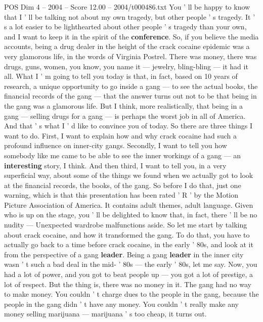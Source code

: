\begin{textsample}{POS Dim 4 – 2004 – Score 12.00 – 2004/t000486.txt}  \label{ex:f4_pos_059}
You ' ll be happy to know that I ' ll be talking not about my own tragedy, but other people ' s tragedy.
It ' s a lot easier to be lighthearted about other people ' s tragedy than your own, and I want to keep it in the spirit of the \textbf{conference}.
So, if you believe the media accounts, being a drug dealer in the height of the crack cocaine epidemic was a very glamorous life, in the words of Virginia Postrel.
There was money, there was drugs, guns, women, you know, you name it — jewelry, bling-bling — it had it all.
What I ' m going to tell you today is that, in fact, based on 10 years of research, a unique opportunity to go inside a gang — to see the actual books, the financial records of the gang — that the answer turns out not to be that being in the gang was a glamorous life.
But I think, more realistically, that being in a gang — selling drugs for a gang — is perhaps the worst job in all of America.
And that ' s what I ' d like to convince you of today.
So there are three things I want to do.
First, I want to explain how and why crack cocaine had such a profound influence on inner-city gangs.
Secondly, I want to tell you how somebody like me came to be able to see the inner workings of a gang — an \textbf{interesting} story, I think.
And then third, I want to tell you, in a very superficial way, about some of the things we found when we actually got to look at the financial records, the books, of the gang.
So before I do that, just one warning, which is that this presentation has been rated ' R ' by the Motion Picture Association of America.
It contains adult themes, adult language.
Given who is up on the stage, you ' ll be delighted to know that, in fact, there ' ll be no nudity — Unexpected wardrobe malfunctions aside.
So let me start by talking about crack cocaine, and how it transformed the gang.
To do that, you have to actually go back to a time before crack cocaine, in the early ' 80s, and look at it from the perspective of a gang \textbf{leader}.
Being a gang \textbf{leader} in the inner city wasn ' t such a bad deal in the mid- ' 80s — the early ' 80s, let me say.
Now, you had a lot of power, and you got to beat people up — you got a lot of prestige, a lot of respect.
But the thing is, there was no money in it.
The gang had no way to make money.
You couldn ' t charge dues to the people in the gang, because the people in the gang didn ' t have any money.
You couldn ' t really make any money selling marijuana — marijuana ' s too cheap, it turns out.

\end{textsample}
